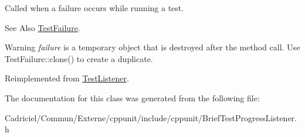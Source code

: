 Called when a failure occurs while running a test. 

\begin{DoxySeeAlso}{See Also}
\hyperlink{class_test_failure}{Test\-Failure}. 
\end{DoxySeeAlso}
\begin{DoxyWarning}{Warning}
{\itshape failure} is a temporary object that is destroyed after the method call. Use Test\-Failure\-::clone() to create a duplicate. 
\end{DoxyWarning}


Reimplemented from \hyperlink{class_test_listener_a103216a5814c907f7b752b969477e765}{Test\-Listener}.



The documentation for this class was generated from the following file\-:\begin{DoxyCompactItemize}
\item 
Cadriciel/\-Commun/\-Externe/cppunit/include/cppunit/Brief\-Test\-Progress\-Listener.\-h\end{DoxyCompactItemize}
